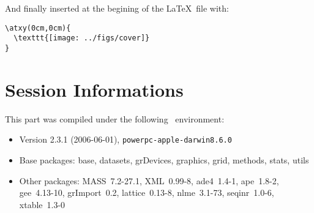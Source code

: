 \documentclass[a4paper]{article}
\begin{document}
And finally inserted at the begining of the \LaTeX~file with:

\begin{verbatim}
\atxy(0cm,0cm){
  \texttt{[image: ../figs/cover]}
}
\end{verbatim}


\section*{Session Informations}

This part was compiled under the following \Rlogo{}~environment:

\begin{itemize}
  \item Version 2.3.1 (2006-06-01), \verb|powerpc-apple-darwin8.6.0|
  \item Base packages: base, datasets, grDevices, graphics, grid,
    methods, stats, utils
  \item Other packages: MASS~7.2-27.1, XML~0.99-8, ade4~1.4-1,
    ape~1.8-2, gee~4.13-10, grImport~0.2, lattice~0.13-8,
    nlme~3.1-73, seqinr~1.0-6, xtable~1.3-0
\end{itemize}




\end{document}
